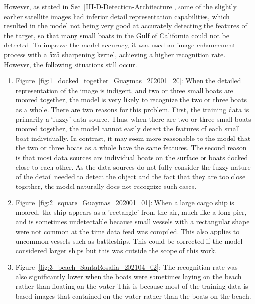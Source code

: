 However, as stated in Sec~\ref{III-D-Detection-Architecture}, some of the slightly earlier satellite images had inferior detail representation capabilities, which resulted in the model not being very good at accurately detecting the features of the target, so that many small boats in the Gulf of California could not be detected. To improve the model accuracy, it was used an image enhancement process with a 5x5 sharpening kernel, achieving a higher recognition rate. However, the following situations still occur.

\begin{enumerate}
    \item Figure~\ref{fig:1_docked_together_Guaymas_202001_20}: When the detailed representation of the image is indigent, and two or three small boats are moored together, the model is very likely to recognize the two or three boats as a whole. There are two reasons for this problem. First, the training data is primarily a `fuzzy' data source. Thus, when there are two or three small boats moored together, the model cannot easily detect the features of each small boat individually. In contrast, it may seem more reasonable to the model that the two or three boats as a whole have the same features. The second reason is that most data sources are individual boats on the surface or boats docked close to each other. As the data sources do not fully consider the fuzzy nature of the detail needed to detect the object and the fact that they are too close together, the model naturally does not recognize such cases.
    
    \item Figure~\ref{fig:2_square_Guaymas_202001_01}: When a large cargo ship is moored, the ship appears as a 'rectangle' from the air, much like a long pier, and is sometimes undetectable because small vessels with a rectangular shape were not common at the time data feed was compiled. This also applies to uncommon vessels such as battleships. This could be corrected if the model considered larger ships but this was outside the scope of this work.

    \item Figure~\ref{fig:3_beach_SantaRosalia_202104_02}: The recognition rate was also significantly lower when the boats were sometimes laying on the beach rather than floating on the water This is because most of the training data is based images that contained on the water rather than the boats on the beach.

\end{enumerate}

